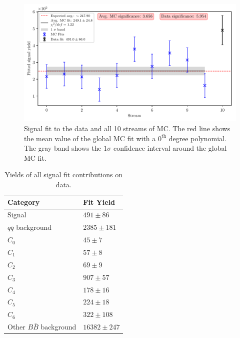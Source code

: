 \begin{figure}[H]
	\centering
	\captionsetup{width=0.8\linewidth}
	\includegraphics[width=\linewidth]{fig/sig_global}
	\caption{Signal fit to the data and all 10 streams of MC. The red line shows the mean value of the global MC fit with a $0^{\mathrm{th}}$ degree polynomial. The gray band shows the $1\sigma$ confidence interval around the global MC fit.}
	\label{fig:sig_all_global}
\end{figure}

\begin{table}[H]
	\centering
	\begin{tabular}{l|l}
		Category & Fit Yield \\
		\toprule
		Signal & $491 \pm 86$ \\
		$q \bar q$ background & $ 2385 \pm 181 $ \\
		$C_0$ & $ 45 \pm 7 $ \\
		$C_1$ & $ 57 \pm 8 $\\
		$C_2$ & $ 69 \pm 9 $ \\
		$C_3$ & $ 907 \pm 57 $ \\
		$C_4$ & $ 178 \pm 16 $ \\
		$C_5$ & $ 224 \pm 18 $ \\
		$C_6$ & $ 322 \pm 108 $ \\
		Other $B \bar B$ background & $ 16382 \pm 247 $ \\
		\bottomrule
	\end{tabular}
	\captionsetup{width=.8\linewidth}
	\caption{Yields of all signal fit contributions on data.}
	\label{tab:sig_yields}
\end{table}

